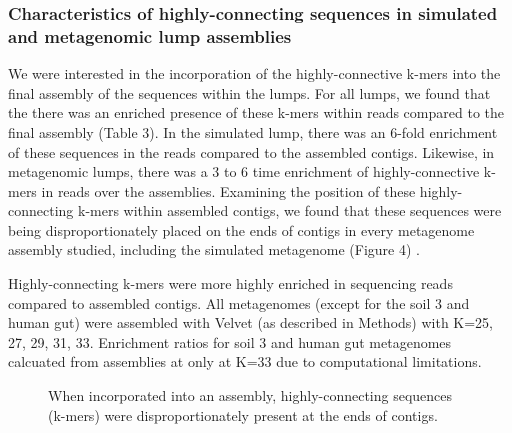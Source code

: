 \documentclass[11pt]{article} %
\begin{document}
\subsubsection{Characteristics of highly-connecting sequences in simulated and metagenomic lump assemblies}

We were interested in the incorporation of the highly-connective k-mers into the final assembly of the sequences within the lumps.  For all lumps, we found that the there was an enriched presence of these k-mers within reads compared to the final assembly (Table 3).  In the simulated lump, there was an 6-fold enrichment of these sequences in the reads compared to the assembled contigs.  Likewise, in metagenomic lumps, there was a 3 to 6 time enrichment of highly-connective k-mers in reads over the assemblies.  Examining the position of these highly-connecting k-mers within assembled contigs, we found that these sequences were being disproportionately placed on the ends of contigs in every metagenome assembly studied, including the simulated metagenome (Figure 4) .  


\begin{table}
\caption{Highly-connecting k-mers were more highly enriched in sequencing reads compared to assembled contigs.  All metagenomes (except for the soil 3 and human gut) were assembled with Velvet (as described in Methods) with K=25, 27, 29, 31, 33.  Enrichment ratios for soil 3 and human gut metagenomes calcuated from assemblies at only at K=33 due to computational limitations.}
\end{table}

\begin{figure}
\caption{When incorporated into an assembly, highly-connecting sequences (k-mers) were disproportionately present at the ends of contigs.}
\end{figure}
\end{document}
